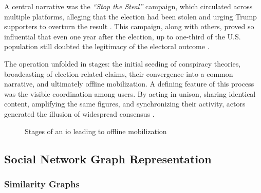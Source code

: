 \documentclass{article}
\begin{document}
A central narrative was the \textit{“Stop the Steal”} campaign, which circulated across multiple platforms, alleging that the election had been stolen and urging Trump supporters to overturn the result \cite{LongFuse2021USElections}. This campaign, along with others, proved so influential that even one year after the election, up to one-third of the U.S. population still doubted the legitimacy of the electoral outcome \cite{stopthesteal2022USelections}.

The operation unfolded in stages: the initial seeding of conspiracy theories, broadcasting of election-related claims, their convergence into a common narrative, and ultimately offline mobilization. A defining feature of this process was the visible coordination among users. By acting in unison, sharing identical content, amplifying the same figures, and synchronizing their activity, actors generated the illusion of widespread consensus \cite{coordinated2024Capitol}.

\begin{figure}[ht]
    \centering
    \caption{Stages of an \ac{io} leading to offline mobilization}
    \label{fig:IO-stages}
\end{figure}

\subsection{Social Network Graph Representation}

\subsubsection{Similarity Graphs} 
\end{document}
